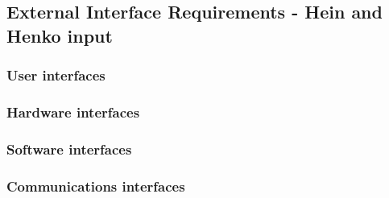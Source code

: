 \subsection{External Interface Requirements - Hein and Henko input}

\subsubsection{User interfaces}
\subsubsection{Hardware interfaces}
\subsubsection{Software interfaces}
\subsubsection{Communications interfaces}